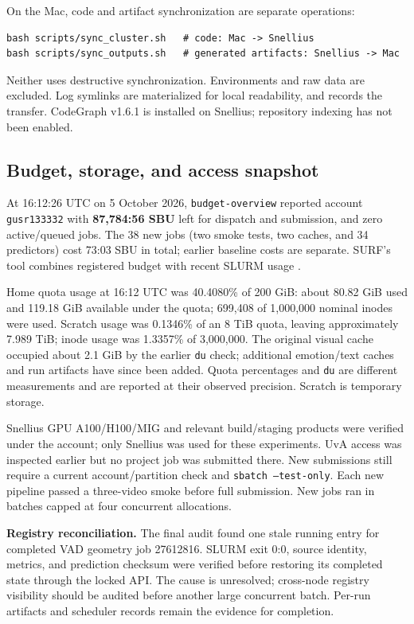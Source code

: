 \documentclass[11pt,a4paper]{article}
\newcommand{\code}[1]{\texttt{#1}}
\begin{document}
On the Mac, code and artifact synchronization are separate operations:
\begin{verbatim}
bash scripts/sync_cluster.sh   # code: Mac -> Snellius
bash scripts/sync_outputs.sh   # generated artifacts: Snellius -> Mac
\end{verbatim}
Neither uses destructive synchronization. Environments and raw data are excluded. Log symlinks are materialized for local readability, and  records the transfer. CodeGraph v1.6.1 is installed on Snellius; repository indexing has not been enabled.

\subsection{Budget, storage, and access snapshot}
At 16:12:26 UTC on 5 October 2026, \code{budget-overview} reported account \code{gusr133332} with \textbf{87,784:56 SBU} left for dispatch and submission, and zero active/queued jobs. The 38 new jobs (two smoke tests, two caches, and 34 predictors) cost 73:03 SBU in total; earlier baseline costs are separate. SURF's tool combines registered budget with recent SLURM usage \cite{surf}.

Home quota usage at 16:12 UTC was 40.4080\% of 200 GiB: about 80.82 GiB used and 119.18 GiB available under the quota; 699,408 of 1,000,000 nominal inodes were used. Scratch usage was 0.1346\% of an 8 TiB quota, leaving approximately 7.989 TiB; inode usage was 1.3357\% of 3,000,000. The original visual cache occupied about 2.1 GiB by the earlier \code{du} check; additional emotion/text caches and run artifacts have since been added. Quota percentages and \code{du} are different measurements and are reported at their observed precision. Scratch is temporary storage.

Snellius GPU A100/H100/MIG and relevant build/staging products were verified under the account; only Snellius was used for these experiments. UvA access was inspected earlier but no project job was submitted there. New submissions still require a current account/partition check and \code{sbatch --test-only}. Each new pipeline passed a three-video smoke before full submission. New jobs ran in batches capped at four concurrent allocations.

\textbf{Registry reconciliation.} The final audit found one stale running entry for completed VAD geometry job 27612816. SLURM exit 0:0, source identity, metrics, and prediction checksum were verified before restoring its completed state through the locked API. The cause is unresolved; cross-node registry visibility should be audited before another large concurrent batch. Per-run artifacts and scheduler records remain the evidence for completion.
\end{document}
